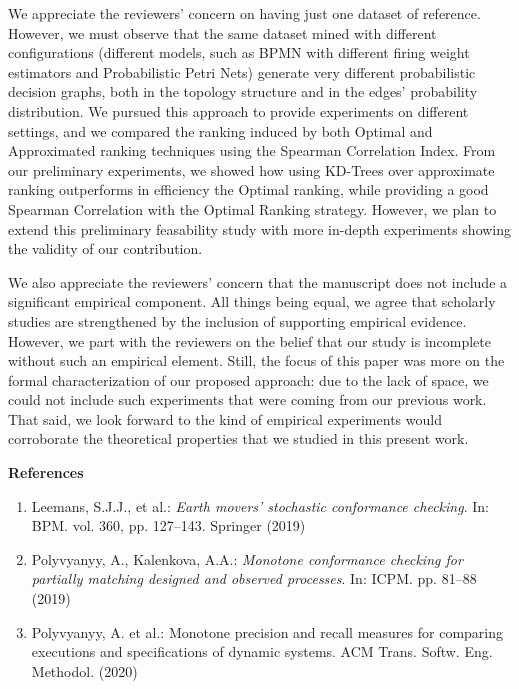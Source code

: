 \documentclass{article}
\begin{document}
We appreciate the reviewers' concern on having just one dataset of reference. However, we must observe that the same dataset mined with different configurations (different models, such as BPMN with different firing weight estimators and Probabilistic Petri Nets) generate very different probabilistic decision graphs, both in the topology structure and in the edges' probability distribution. We pursued this approach to provide experiments on different settings, and we compared the ranking induced by both Optimal and Approximated ranking techniques using the Spearman Correlation Index. From our preliminary experiments, we showed how using KD-Trees over approximate ranking outperforms in efficiency the Optimal ranking, while providing a good Spearman Correlation with the Optimal Ranking strategy. However, we plan to extend this preliminary feasability study with more in-depth experiments showing the validity of our contribution.

We also appreciate the reviewers' concern that the manuscript does not include a significant empirical component. All things being equal, we agree that scholarly studies are strengthened by the inclusion of supporting empirical evidence. However, we part with the reviewers on the belief that our study is incomplete without such an empirical element. Still, the focus of this paper was more on the formal characterization of our proposed approach: due to the lack of space, we could not include such experiments that were coming from our previous work. That said, we look forward to the kind of empirical experiments would corroborate the theoretical properties that we studied in this present work.

\textbf{References}
\begin{enumerate}
	\item\label{a} Leemans, S.J.J., et al.: \textit{Earth movers’ stochastic
	conformance checking}. In: BPM. vol. 360, pp. 127–143. Springer (2019)
\item\label{b} Polyvyanyy, A., Kalenkova, A.A.: \textit{Monotone conformance checking for partially
matching designed and observed processes}. In: ICPM. pp. 81–88 (2019)
\item\label{c} Polyvyanyy, A. et al.: Monotone precision and recall measures for comparing executions and specifications of dynamic
systems. ACM Trans. Softw. Eng. Methodol.  (2020)
\end{enumerate}
\end{document}
